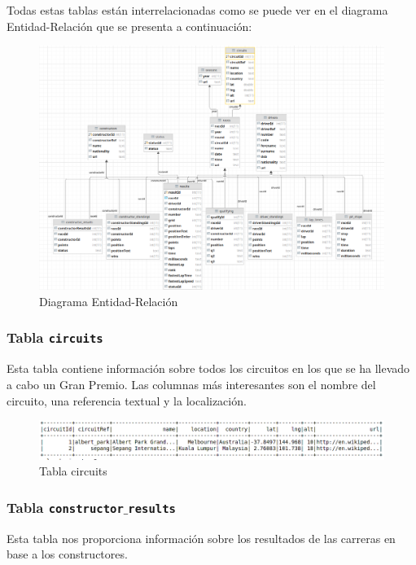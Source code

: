 \documentclass[12pt,twoside,titlepage]{report}
\begin{document}
Todas estas tablas están interrelacionadas como se puede ver en el diagrama Entidad-Relación que se presenta a continuación:

\begin{figure}[H]
  \includegraphics[scale=0.4]{dataset_visualization.png}
  \centering
  \caption{Diagrama Entidad-Relación}
  \label{fig:datavisualization}
  \centering
\end{figure}


\subsubsection{Tabla \texttt{circuits}}

Esta tabla contiene información sobre todos los circuitos en los que se ha llevado a cabo un Gran Premio. Las columnas más interesantes son el nombre del circuito, una referencia textual y la localización. 

\begin{figure}[H]
  \includegraphics[scale=0.4]{circuits_table.png}
  \centering
  \caption{Tabla circuits}
  \label{fig:circuits}
  \centering
\end{figure}

\subsubsection{Tabla \texttt{constructor$\_$results}}

Esta tabla nos proporciona información sobre los resultados de las carreras en base a los constructores. 
\end{document}
